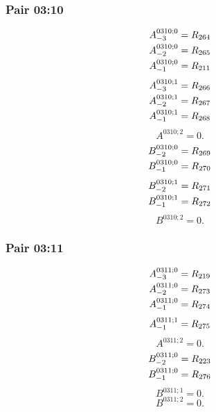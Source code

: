 \documentclass[11pt,a4paper]{article}
\begin{document}
\subsubsection{Pair 03:10}
\begin{equation}
\shortstack[l]{$\displaystyle A^{0310;0}_{-3}=R_{264}$\\
$\displaystyle A^{0310;0}_{-2}=R_{265}$\\
$\displaystyle A^{0310;0}_{-1}=R_{211}$}
\label{eq:cat-map-234}
\end{equation}
\begin{equation}
\shortstack[l]{$\displaystyle A^{0310;1}_{-3}=R_{266}$\\
$\displaystyle A^{0310;1}_{-2}=R_{267}$\\
$\displaystyle A^{0310;1}_{-1}=R_{268}$}
\label{eq:cat-map-235}
\end{equation}
\begin{equation}
A^{0310;2}=0.
\label{eq:cat-map-236}
\end{equation}
\begin{equation}
\shortstack[l]{$\displaystyle B^{0310;0}_{-2}=R_{269}$\\
$\displaystyle B^{0310;0}_{-1}=R_{270}$}
\label{eq:cat-map-237}
\end{equation}
\begin{equation}
\shortstack[l]{$\displaystyle B^{0310;1}_{-2}=R_{271}$\\
$\displaystyle B^{0310;1}_{-1}=R_{272}$}
\label{eq:cat-map-238}
\end{equation}
\begin{equation}
B^{0310;2}=0.
\label{eq:cat-map-239}
\end{equation}
\subsubsection{Pair 03:11}
\begin{equation}
\shortstack[l]{$\displaystyle A^{0311;0}_{-3}=R_{219}$\\
$\displaystyle A^{0311;0}_{-2}=R_{273}$\\
$\displaystyle A^{0311;0}_{-1}=R_{274}$}
\label{eq:cat-map-240}
\end{equation}
\begin{equation}
\shortstack[l]{$\displaystyle A^{0311;1}_{-1}=R_{275}$}
\label{eq:cat-map-241}
\end{equation}
\begin{equation}
A^{0311;2}=0.
\label{eq:cat-map-242}
\end{equation}
\begin{equation}
\shortstack[l]{$\displaystyle B^{0311;0}_{-2}=R_{223}$\\
$\displaystyle B^{0311;0}_{-1}=R_{276}$}
\label{eq:cat-map-243}
\end{equation}
\begin{equation}
B^{0311;1}=0.
\label{eq:cat-map-244}
\end{equation}
\begin{equation}
B^{0311;2}=0.
\label{eq:cat-map-245}
\end{equation}
\end{document}
